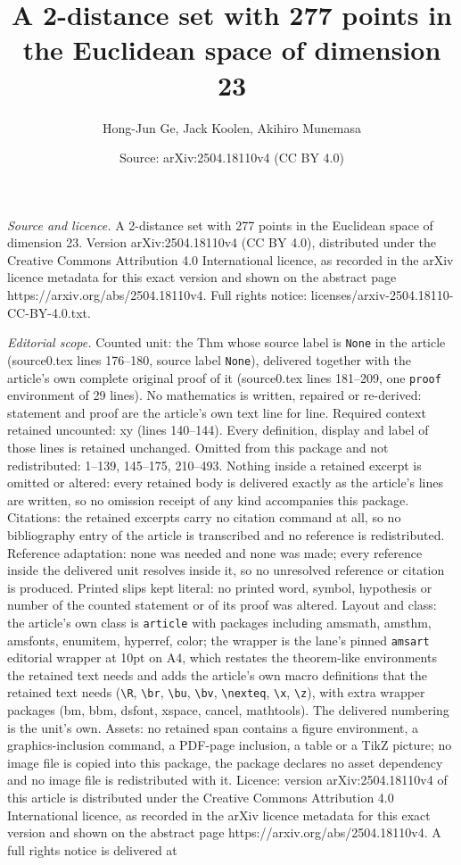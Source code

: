 \documentclass[10pt,a4paper]{amsart}
\title[A 2-distance set with 277 points in the Euclidean space of d]{A 2-distance set with 277 points in the Euclidean space of dimension 23}
\author{Hong-Jun Ge, Jack Koolen, Akihiro Munemasa}
\date{Source: arXiv:2504.18110v4 (CC BY 4.0)}
\begin{document}
\maketitle

\noindent\emph{Source and licence.} A 2-distance set with 277 points in the Euclidean space of dimension 23. Version arXiv:2504.18110v4 (CC BY 4.0), distributed under the Creative Commons Attribution 4.0 International licence, as recorded in the arXiv licence metadata for this exact version and shown on the abstract page https://arxiv.org/abs/2504.18110v4. Full rights notice: licenses/arxiv-2504.18110-CC-BY-4.0.txt.\par\smallskip

\noindent\textit{Editorial scope.} Counted unit: the Thm whose source label is \texttt{None} in the article (source0.tex lines 176--180, source label \texttt{None}), delivered together with the article's own complete original proof of it (source0.tex lines 181--209, one \texttt{proof} environment of 29 lines). No mathematics is written, repaired or re-derived: statement and proof are the article's own text line for line. Required context retained uncounted: xy (lines 140--144). Every definition, display and label of those lines is retained unchanged. Omitted from this package and not redistributed: 1--139, 145--175, 210--493. Nothing inside a retained excerpt is omitted or altered: every retained body is delivered exactly as the article's lines are written, so no omission receipt of any kind accompanies this package. Citations: the retained excerpts carry no citation command at all, so no bibliography entry of the article is transcribed and no reference is redistributed. Reference adaptation: none was needed and none was made; every reference inside the delivered unit resolves inside it, so no unresolved reference or citation is produced. Printed slips kept literal: no printed word, symbol, hypothesis or number of the counted statement or of its proof was altered. Layout and class: the article's own class is \texttt{article} with packages including amsmath, amsthm, amsfonts, enumitem, hyperref, color; the wrapper is the lane's pinned \texttt{amsart} editorial wrapper at 10pt on A4, which restates the theorem-like environments the retained text needs and adds the article's own macro definitions that the retained text needs (\texttt{\textbackslash R}, \texttt{\textbackslash br}, \texttt{\textbackslash bu}, \texttt{\textbackslash bv}, \texttt{\textbackslash nexteq}, \texttt{\textbackslash x}, \texttt{\textbackslash z}), with extra wrapper packages (bm, bbm, dsfont, xspace, cancel, mathtools). The delivered numbering is the unit's own. Assets: no retained span contains a figure environment, a graphics-inclusion command, a PDF-page inclusion, a table or a TikZ picture; no image file is copied into this package, the package declares no asset dependency and no image file is redistributed with it. Licence: version arXiv:2504.18110v4 of this article is distributed under the Creative Commons Attribution 4.0 International licence, as recorded in the arXiv licence metadata for this exact version and shown on the abstract page https://arxiv.org/abs/2504.18110v4. A full rights notice is delivered at 
\end{document}
